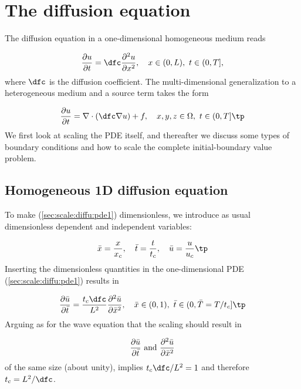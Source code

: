 \documentclass[graybox,envcountchap,sectrefs,final]{svmonodo}
\begin{document}
\section{The diffusion equation}
\label{sec:scale:diffu}

The diffusion equation in a one-dimensional homogeneous medium reads

\begin{equation}
\frac{\partial u}{\partial t} =
\dfc\frac{\partial^2 u}{\partial x^2}, \quad  x\in (0,L),\ t\in (0,T],
\label{sec:scale:diffu:pde1}
\end{equation}
where $\dfc$ is the diffusion coefficient. The
multi-dimensional generalization to a heterogeneous medium
and a source term takes the form

\begin{equation}
\frac{\partial u}{\partial t} =
\nabla\cdot\left(\dfc \nabla u\right) + f, \quad  x,y,z\in \Omega,\ t\in (0,T]\tp
\label{sec:scale:diffu:pde1:3D}
\end{equation}
We first look at scaling the PDE itself, and thereafter we discuss
some types of boundary conditions and how to scale the complete
initial-boundary value problem.


\subsection{Homogeneous 1D diffusion equation}
\label{sec:scale:diffu:homo1D}

To make (\ref{sec:scale:diffu:pde1}) dimensionless,
we introduce as usual dimensionless dependent and independent variables:

\[ \bar x = \frac{x}{x_c},
\quad \bar t = \frac{t}{t_c}, \quad \bar u =\frac{u}{u_c}\tp\]
Inserting the dimensionless quantities in the one-dimensional
PDE (\ref{sec:scale:diffu:pde1}) results in

\[
\frac{\partial \bar u}{\partial \bar t} =
\frac{t_c\dfc}{L^2}
\frac{\partial^2 \bar u}{\partial \bar x^2}, \quad  \bar x\in (0,1),\ \bar t\in (0,\bar T = T/t_c]\tp
\label{sec:scale:diffu:pde1:d0}
\]
Arguing as for the wave equation that the scaling should result in

\[ \frac{\partial \bar u}{\partial \bar t}\hbox{ and }
\frac{\partial^2 \bar u}{\partial \bar x^2}\]
of the same size (about unity),
implies $t_c\dfc/L^2=1$ and therefore $t_c = L^2/\dfc$.
\end{document}
